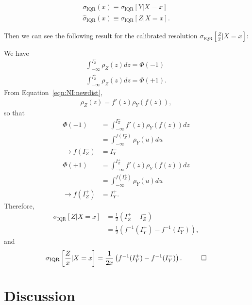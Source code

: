 \begin{align}
\sigma_\text{IQR}(x) \equiv \sigma_\text{IQR}[Y|X=x]\\
\hat{\sigma}_\text{IQR}(x) \equiv \sigma_\text{IQR}[Z|X=x].
\end{align}

\noindent Then we can see the following result for the calibrated resolution $\sigma_\text{IQR}[\frac{Z}{x}|X=x]$:

\vspace{5mm}


\vspace{5mm}

We have
\begin{align}
\int_{-\infty}^{I_Z^-}\rho_Z(z)dz = \Phi(-1)\\
\int_{-\infty}^{I_Z^+}\rho_Z(z)dz = \Phi(+1).
\end{align}
From Equation~\ref{eqn:NI:newdist},
\begin{align}
\rho_Z(z) = f'(z)\rho_Y(f(z)),
\end{align}
so that
\begin{align}
\Phi(-1) &= \int_{-\infty}^{I_Z^-}f'(z)\rho_Y(f(z))dz\nonumber\\
&=\int_{-\infty}^{f(I_Z^-)}\rho_Y(u)du\nonumber\\
\rightarrow f(I_Z^-) &= I_Y^-\\
\Phi(+1) &= \int_{-\infty}^{I_Z^+}f'(z)\rho_Y(f(z))dz\nonumber\\
&=\int_{-\infty}^{f(I_Z^+)}\rho_Y(u)du\nonumber\\
\rightarrow f(I_Z^+) &= I_Y^+.
\end{align}
Therefore,
\begin{align}
\sigma_\text{IQR}[Z|X=x] &= \frac{1}{2}\left(I_Z^+-I_Z^-\right)\nonumber\\
&=\frac{1}{2}\left(f^{-1}(I_Y^+)-f^{-1}(I_Y^-)\right),
\end{align}
and
\begin{align}
\sigma_\text{IQR}\left[\frac{Z}{x}|X=x\right]=\frac{1}{2x}\left(f^{-1}(I_Y^+)-f^{-1}(I_Y^-)\right).\hspace{1 cm}\Box
\label{eqn:NI:resolutionmedian_text}
\end{align}
\newpage
\section{Discussion}
\label{sec:NI:discussion}

